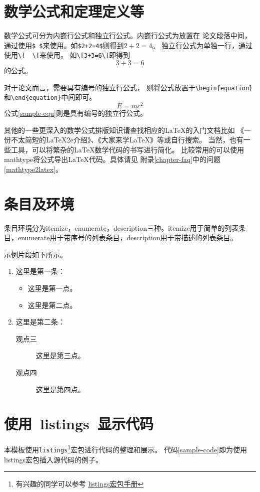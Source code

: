 \section{数学公式和定理定义等}
\label{sec-math}
数学公式可分为内嵌行公式和独立行公式。{\heiti 内嵌行公式}为放置在
论文段落中间，通过使用\verb|$ $|来使用。如\verb|$2+2=4$|则得到$2+2=4$。
{\heiti 独立行公式}为单独一行，通过使用\verb|\[  \]|来使用。
如\verb|\[3+3=6\]|即得到\[3+3=6\]的公式。

对于论文而言，需要{\heiti 具有编号}的独立行公式，
则将公式放置于\verb|\begin{equation}|和\verb|\end{equation}|中间即可。
\begin{equation}
\label{sample-equ}
E=mc^2
\end{equation}
公式\ref{sample-equ}则是具有编号的独立行公式。

其他的一些更深入的数学公式排版知识请查找相应的\LaTeX{}的入门文档比如
《一份不太简短的\LaTeX2e{}介绍》、《大家来学\LaTeX{}》等或自行搜索。
当然，也有一些工具，可以将繁杂的\LaTeX{}数学代码的书写进行简化。
比较常用的可以使用mathtype将公式导出\LaTeX{}代码。具体请见
附录\ref{chapter-faq}中的问题\ref{mathtype2latex}。

\section{条目及环境}
\label{sec-item}
条目环境分为itemize，enumerate，description三种。itemize用于简单的列表条目，enumerate用于带序号的列表条目，description用于带描述的列表条目。

示例片段如下所示。
\begin{enumerate}
    \item 这里是第一条：
        \begin{itemize}
            \item 这里是第一点。
            \item 这里是第二点。
        \end{itemize}
    \item 这里是第二条：
        \begin{description}
            \item[观点三] 这里是第三点。
            \item[观点四] 这里是第四点。
        \end{description}
\end{enumerate}

\section{使用~listings~显示代码}
\label{sec-listings}
本模板使用\texttt{listings}\footnote{有兴趣的同学可以参考
\href{http://mirror.ctan.org/macros/latex/contrib/listings/listings.pdf}
{listings宏包手册}}宏包进行代码的整理和展示。
代码\ref{sample-code}即为使用listings宏包插入源代码的例子。

